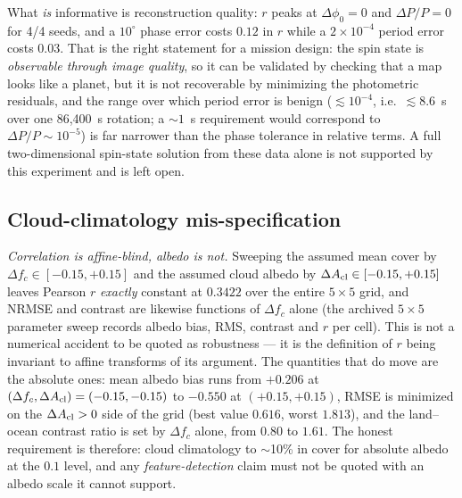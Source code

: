 \documentclass[twocolumn,10pt]{article}
\begin{document}
What \emph{is} informative is reconstruction quality: $r$ peaks at
$\Delta\phi_0=0$ and $\Delta P/P=0$ for 4/4 seeds, and a $10^\circ$ phase error
costs $0.12$ in $r$ while a $2\times10^{-4}$ period error costs $0.03$. That is
the right statement for a mission design: the spin state is
\emph{observable through image quality}, so it can be validated by checking
that a map looks like a planet, but it is not recoverable by minimizing the
photometric residuals, and the range over which period error is benign
($\lesssim10^{-4}$, i.e.\ $\lesssim8.6$~s over one 86{,}400~s rotation; a $\sim1$~s
requirement would correspond to $\Delta P/P\sim10^{-5}$) is far narrower than the phase
tolerance in relative terms. A full two-dimensional spin-state solution from
these data alone is not supported by this experiment and is left open.

\subsection{Cloud-climatology mis-specification}
\label{sec:climrobust}
\emph{Correlation is affine-blind, albedo is not.} Sweeping the assumed mean
cover by $\Delta f_c\in[-0.15,+0.15]$ and the assumed cloud albedo by
$\Delta A_{\rm cl}\in[-0.15,+0.15]$ leaves Pearson $r$ \emph{exactly} constant
at $0.3422$ over the entire $5\times5$ grid, and NRMSE and contrast are
likewise functions of $\Delta f_c$ alone (the archived $5\times5$ parameter sweep records albedo bias, RMS, contrast and $r$ per cell). This is not a numerical accident to be
quoted as robustness --- it is the definition of $r$ being invariant to affine
transforms of its argument.
The quantities that do move are the absolute ones: mean albedo bias runs from
$+0.206$ at $(\Delta f_c,\Delta A_{\rm cl})=(-0.15,-0.15)$ to $-0.550$ at
$(+0.15,+0.15)$, RMSE is minimized on the $\Delta A_{\rm cl}>0$ side of the
grid (best value $0.616$, worst $1.813$), and the land--ocean contrast ratio is
set by $\Delta f_c$ alone, from $0.80$ to $1.61$. The honest requirement is
therefore: cloud climatology to $\sim$10\% in cover for absolute albedo at the
$0.1$ level, and any \emph{feature-detection} claim must not be quoted with an
albedo scale it cannot support.
\end{document}

